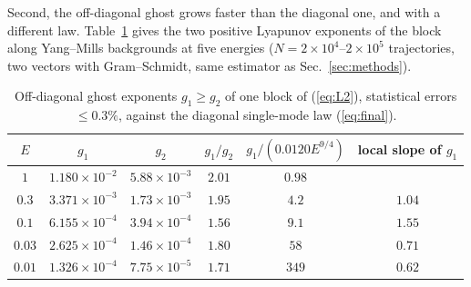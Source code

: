 Second, the off-diagonal ghost grows faster than the diagonal one, and with a different law.
Table~\ref{tab:offdiag} gives the two positive Lyapunov exponents of the block along
Yang--Mills backgrounds at five energies ($N=2\times10^4$--$2\times10^5$ trajectories, two
vectors with Gram--Schmidt, same estimator as Sec.~\ref{sec:methods}).

\begin{table}
\centering
\caption{Off-diagonal ghost exponents $g_1\ge g_2$ of one block of (\ref{eq:L2}), statistical
errors $\le0.3\%$, against the diagonal single-mode law (\ref{eq:final}).}
\label{tab:offdiag}
\begin{tabular}{cccccc}
\toprule
$E$ & $g_1$ & $g_2$ & $g_1/g_2$ & $g_1/(0.0120E^{9/4})$ & local slope of $g_1$\\
\midrule
$1$    & $1.180\times10^{-2}$ & $5.88\times10^{-3}$ & $2.01$ & $0.98$ & \\
$0.3$  & $3.371\times10^{-3}$ & $1.73\times10^{-3}$ & $1.95$ & $4.2$ & $1.04$\\
$0.1$  & $6.155\times10^{-4}$ & $3.94\times10^{-4}$ & $1.56$ & $9.1$ & $1.55$\\
$0.03$ & $2.625\times10^{-4}$ & $1.46\times10^{-4}$ & $1.80$ & $58$ & $0.71$\\
$0.01$ & $1.326\times10^{-4}$ & $7.75\times10^{-5}$ & $1.71$ & $349$ & $0.62$\\
\bottomrule
\end{tabular}
\end{table}

